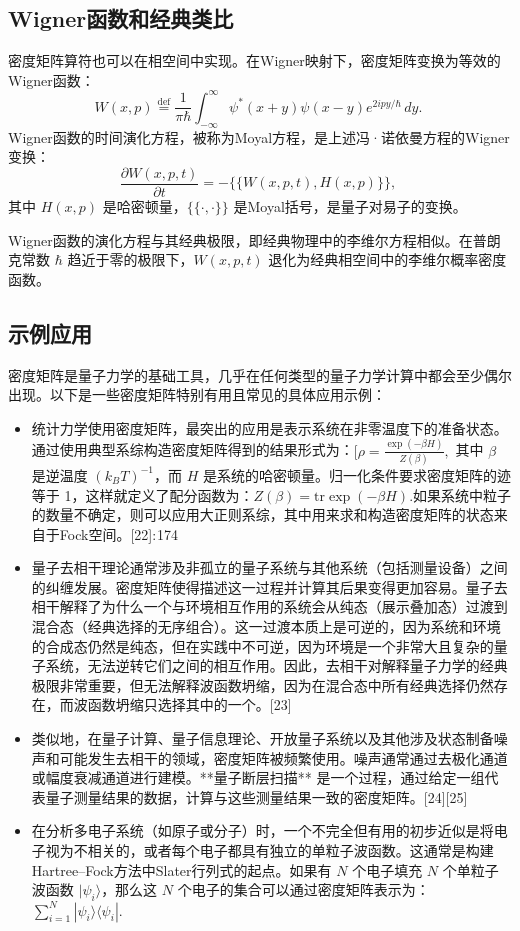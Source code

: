 \subsection{Wigner函数和经典类比}
密度矩阵算符也可以在相空间中实现。在Wigner映射下，密度矩阵变换为等效的Wigner函数：
\[
W(x,p) \stackrel{\mathrm{def}}{=} \frac{1}{\pi \hbar} \int_{-\infty}^{\infty} \psi^*(x+y)\psi(x-y) e^{2ipy/\hbar} \, dy.~
\]
Wigner函数的时间演化方程，被称为Moyal方程，是上述冯·诺依曼方程的Wigner变换：
\[
\frac{\partial W(x,p,t)}{\partial t} = -\{\{W(x,p,t), H(x,p)\}\},~
\]
其中 \( H(x,p) \) 是哈密顿量，\(\{\{\cdot, \cdot \}\}\) 是Moyal括号，是量子对易子的变换。

Wigner函数的演化方程与其经典极限，即经典物理中的李维尔方程相似。在普朗克常数 \(\hbar\) 趋近于零的极限下，\( W(x,p,t) \) 退化为经典相空间中的李维尔概率密度函数。
\subsection{示例应用}
密度矩阵是量子力学的基础工具，几乎在任何类型的量子力学计算中都会至少偶尔出现。以下是一些密度矩阵特别有用且常见的具体应用示例：

\begin{itemize}
\item 统计力学使用密度矩阵，最突出的应用是表示系统在非零温度下的准备状态。通过使用典型系综构造密度矩阵得到的结果形式为：\([\rho = \frac{\exp(-\beta H)}{Z(\beta)},\)
其中 \( \beta \) 是逆温度 \( (k_B T)^{-1} \)，而 \( H \) 是系统的哈密顿量。归一化条件要求密度矩阵的迹等于 1，这样就定义了配分函数为：\(Z(\beta) = \mathrm{tr} \exp(-\beta H).\)如果系统中粒子的数量不确定，则可以应用大正则系综，其中用来求和构造密度矩阵的状态来自于Fock空间。[22]: 174 
\item 量子去相干理论通常涉及非孤立的量子系统与其他系统（包括测量设备）之间的纠缠发展。密度矩阵使得描述这一过程并计算其后果变得更加容易。量子去相干解释了为什么一个与环境相互作用的系统会从纯态（展示叠加态）过渡到混合态（经典选择的无序组合）。这一过渡本质上是可逆的，因为系统和环境的合成态仍然是纯态，但在实践中不可逆，因为环境是一个非常大且复杂的量子系统，无法逆转它们之间的相互作用。因此，去相干对解释量子力学的经典极限非常重要，但无法解释波函数坍缩，因为在混合态中所有经典选择仍然存在，而波函数坍缩只选择其中的一个。[23]
\item 类似地，在量子计算、量子信息理论、开放量子系统以及其他涉及状态制备噪声和可能发生去相干的领域，密度矩阵被频繁使用。噪声通常通过去极化通道或幅度衰减通道进行建模。**量子断层扫描** 是一个过程，通过给定一组代表量子测量结果的数据，计算与这些测量结果一致的密度矩阵。[24][25]
\item 在分析多电子系统（如原子或分子）时，一个不完全但有用的初步近似是将电子视为不相关的，或者每个电子都具有独立的单粒子波函数。这通常是构建Hartree–Fock方法中Slater行列式的起点。如果有 \( N \) 个电子填充 \( N \) 个单粒子波函数 \( |\psi_i \rangle \)，那么这 \( N \) 个电子的集合可以通过密度矩阵表示为：\(\sum_{i=1}^{N} |\psi_i \rangle \langle \psi_i |.\)
\end{itemize}
